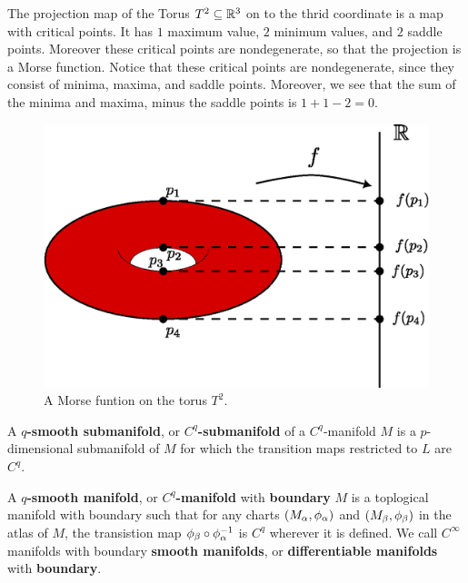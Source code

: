 \begin{example}\label{1.8}
    The projection map of the Torus $T^2 \subseteq \mathbb{R}^3$ on to the thrid
    coordinate is a map with critical points. It has $1$ maximum value,  $2$
    minimum values, and  $2$ saddle points. Moreover these critical points are
    nondegenerate, so that the projection is a Morse function. Notice that these
    critical points are nondegenerate, since they consist of minima, maxima, and
    saddle points. Moreover, we see that the sum of the minima and maxima, minus
    the saddle points is $1+1-2=0$.
    \begin{figure}[h]
        \centering
        \includegraphics[scale=0.5]{Figures/Chapter1/morse_func_torus.eps}
        \caption{A Morse funtion on the torus $T^2$.}
        \label{figure_1.5}
    \end{figure}
\end{example}

\begin{definition}
    A \textbf{$q$-smooth submanifold}, or  \textbf{$C^q$-submanifold} of a
     $C^q$-manifold  $M$ is a  $p$-dimensional submanifold of $M$ for which the
     transition maps restricted to $L$ are  $C^q$.
\end{definition}

\begin{definition}
    A  \textbf{$q$-smooth manifold}, or \textbf{$C^q$-manifold} with
    \textbf{boundary} $M$ is a toplogical manifold with boundary such that for any
    charts $(M_\alpha,\phi_\alpha)$ and $(M_\beta,\phi_\beta)$ in the atlas of $M$, the
    transistion map  $\phi_\beta \circ \phi_\alpha^{-1}$ is $C^q$ wherever it is
    defined. We call $C^\infty$ manifolds with boundary  \textbf{smooth
    manifolds}, or \textbf{differentiable manifolds} with \textbf{boundary}.
\end{definition}
